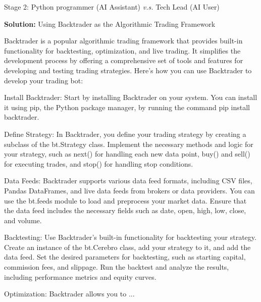 \begin{AIBoxBreak}{Stage 2: Python programmer (AI Assistant) \textit{v.s.} Tech Lead (AI User)}
\assistantmsg

\textbf{Solution:} Using Backtrader as the Algorithmic Trading Framework

Backtrader is a popular algorithmic trading framework that provides built-in functionality for backtesting, optimization, and live trading. It simplifies the development process by offering a comprehensive set of tools and features for developing and testing trading strategies. Here’s how you can use Backtrader to develop your trading bot:

Install Backtrader: Start by installing Backtrader on your system. You can install it using pip, the Python package manager, by running the command pip install backtrader.

Define Strategy: In Backtrader, you define your trading strategy by creating a subclass of the bt.Strategy class. Implement the necessary methods and logic for your strategy, such as next() for handling each new data point, buy() and sell() for executing trades, and stop() for handling stop conditions.

Data Feeds: Backtrader supports various data feed formats, including CSV files, Pandas DataFrames, and live data feeds from brokers or data providers. You can use the bt.feeds module to load and preprocess your market data. Ensure that the data feed includes the necessary fields such as date, open, high, low, close, and volume.

Backtesting: Use Backtrader’s built-in functionality for backtesting your strategy. Create an instance of the bt.Cerebro class, add your strategy to it, and add the data feed. Set the desired parameters for backtesting, such as starting capital, commission fees, and slippage. Run the backtest and analyze the results, including performance metrics and equity curves.

Optimization: Backtrader allows you to ...

\end{AIBoxBreak}